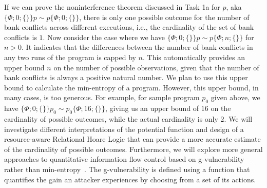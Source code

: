 If we can prove the noninterference theorem discussed in Task 1a  for $p$, aka $\{\Phi;0; \{\}\}p \sim p\{\Phi;0;\{\}\}$, there is only one possible outcome for the number of bank conflicts across different executions, i.e., the cardinality of the set of bank conflicts is $1$.
%
Now consider the case where we have $\{\Phi;0; \{\}\}p \sim p\{\Phi;n;\{\}\}$ for $n > 0$.
%
It indicates that the differences between the number of bank conflicts in any two runs of the program is capped by $n$.
%
This automatically provides an upper bound $n$ on the number of possible observations, given that the number of bank conflicts is always a positive natural number. 
%
We plan to use this upper bound to calculate the min-entropy of a program.
%
However, this upper bound, in many cases, is too generous.
%
For example, for sample program $p_0$ given above, we have $\{\Phi;0; \{\}\}p_0 \sim p_0\{\Phi;16;\{\}\}$, giving us an upper bound of $16$ on the cardinality of possible outcomes, while the actual cardinality is only $2$.
%
We will investigate different interpretations of the potential function and design of a resource-aware Relational Hoare Logic that can provide a more accurate estimate of the cardinality of possible outcomes.
%
Furthermore, we will explore more general approaches to quantitative information flow control based on g-vulnerability rather than min-entropy~\cite{alvim2020springer}.
%
The g-vulnerability is defined using a function that quantifies the gain an attacker experiences by choosing from a set of its actions. 
%
%
%


